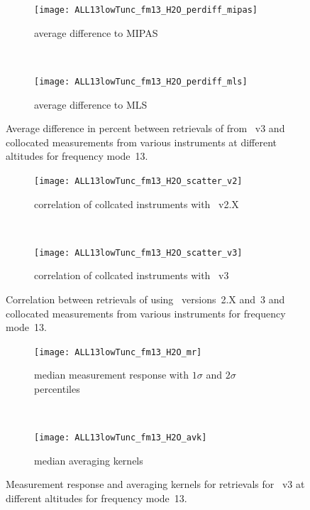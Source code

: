 \begin{figure}[tbhp]
    \centering
    \begin{subfigure}[b]{0.49\textwidth}
        \texttt{[image: ALL13lowTunc\_fm13\_H2O\_perdiff\_mipas]}
        \caption{average difference to MIPAS}
        \label{fig:fm13:H2O:profiles:MIPAS}
    \end{subfigure}
    \,
    \begin{subfigure}[b]{0.49\textwidth}
        \texttt{[image: ALL13lowTunc\_fm13\_H2O\_perdiff\_mls]}
        \caption{average difference to MLS}
        \label{fig:fm13:H2O:profiles:MLS}
    \end{subfigure}
    \caption{Average difference in percent between retrievals of 
    from \smr~v3 and collocated measurements from various instruments at
    different altitudes for frequency mode~13.}

    \label{fig:fm13:H2O:profiles}
\end{figure}

\begin{figure}[tbhp]
    \centering
    \begin{subfigure}[b]{0.49\textwidth}
        \texttt{[image: ALL13lowTunc\_fm13\_H2O\_scatter\_v2]}
        \caption{correlation of collcated instruments with \smr~v2.X}
        \label{fig:fm13:H2O:scatter:v2}
    \end{subfigure}
    \,
    \begin{subfigure}[b]{0.49\textwidth}
        \texttt{[image: ALL13lowTunc\_fm13\_H2O\_scatter\_v3]}
        \caption{correlation of collcated instruments with \smr~v3}
        \label{fig:fm13:H2O:scatter:v3}
    \end{subfigure}
    \caption{Correlation between retrievals of  using \smr\
    versions~2.X and~3 and collocated measurements from various instruments
    for frequency mode~13.}
    \label{fig:fm13:H2O:scatter}
\end{figure}

\begin{figure}[tbhp]
    \centering
    \begin{subfigure}[b]{0.49\textwidth}
        \texttt{[image: ALL13lowTunc\_fm13\_H2O\_mr]}
        \caption{median measurement response with $1\sigma$ and $2\sigma$
        percentiles}
        \label{fig:fm13:H2O:mr}
    \end{subfigure}
    \,
    \begin{subfigure}[b]{0.49\textwidth}
        \texttt{[image: ALL13lowTunc\_fm13\_H2O\_avk]}
        \caption{median averaging kernels\newline~}
        \label{fig:fm13:H2O:avk}
    \end{subfigure}
    \caption{Measurement response and averaging kernels for 
    retrievals for \smr~v3 at different altitudes for frequency mode~13.}
    \label{fig:fm13:H2O:mr_avk}
\end{figure}


